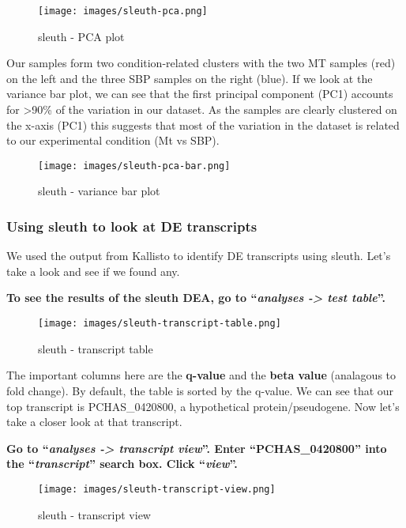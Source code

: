 \documentclass[11pt]{article}
\begin{document}
    \begin{figure}[!h]
\centering
\texttt{[image: images/sleuth-pca.png]}
\caption{sleuth - PCA plot}
\end{figure}

    Our samples form two condition-related clusters with the two MT samples
(red) on the left and the three SBP samples on the right (blue). If we
look at the variance bar plot, we can see that the first principal
component (PC1) accounts for \textgreater90\% of the variation in our
dataset. As the samples are clearly clustered on the x-axis (PC1) this
suggests that most of the variation in the dataset is related to our
experimental condition (Mt vs SBP).

    \begin{figure}[!h]
\centering
\texttt{[image: images/sleuth-pca-bar.png]}
\caption{sleuth - variance bar plot}
\end{figure}

    \hypertarget{using-sleuth-to-look-at-de-transcripts}{%
\subsubsection{Using sleuth to look at DE
transcripts}\label{using-sleuth-to-look-at-de-transcripts}}

We used the output from Kallisto to identify DE transcripts using
sleuth. Let's take a look and see if we found any.

\textbf{To see the results of the sleuth DEA, go to ``\textit{analyses
-\textgreater{} test table}''.}

    \begin{figure}[!h]
\centering
\texttt{[image: images/sleuth-transcript-table.png]}
\caption{sleuth - transcript table}
\end{figure}

    The important columns here are the \textbf{q-value} and the \textbf{beta
value} (analagous to fold change). By default, the table is sorted by
the q-value. We can see that our top transcript is PCHAS\_0420800, a
hypothetical protein/pseudogene. Now let's take a closer look at that
transcript.

\textbf{Go to ``\textit{analyses -\textgreater{} transcript view}''. Enter
``PCHAS\_0420800'' into the ``\textit{transcript}'' search box. Click
``\textit{view}''.}

    \begin{figure}[!h]
\centering
\texttt{[image: images/sleuth-transcript-view.png]}
\caption{sleuth - transcript view}
\end{figure}
\end{document}
